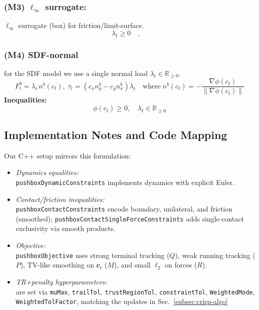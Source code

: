 \documentclass[conference]{IEEEtran}
\begin{document}
\subsubsection{(M3) $\ell_\infty$ surrogate:} $\ell_\infty$ surrogate (box) for friction/limit-surface.
\[
\lambda_{t}\ge 0\quad,
\quad
\]

\subsubsection{(M4) SDF-normal} for the SDF model we use a single normal load $\lambda_t\in\mathbb{R}_{\ge 0}$.
\[
F^b_t=\lambda_t\, n^b( c_t), \; \tau_t=(c_x n_y^b-c_y n_x^b)\lambda_t \quad \text{where} \;   n^b( c_t) = -\frac{\nabla\phi( c_t)}{\|\nabla\phi( c_t)\|}
\]
\textbf{Inequalities:}
\[
\phi( c_t)\ge0, \quad \lambda_t \in \mathbb{R}_{\ge 0}
\]

\subsection{Implementation Notes and Code Mapping}
\label{subsec:impl-mapping}
Our C++ setup mirrors this formulation:
\begin{itemize}
\item \textit{Dynamics equalities:} \\
\texttt{pushboxDynamicConstraints} implements dynamics with explicit Euler.

\item \textit{Contact/friction inequalities:} \\
\texttt{pushboxContactConstraints} encode boundary, unilateral, and friction (smoothed); \texttt{pushboxContactSingleForceConstraints} adds single-contact exclusivity via smooth products.

\item \textit{Objective:}\\
\texttt{pushboxObjective} uses strong terminal tracking ($Q$), weak running tracking ($P$), TV-like smoothing on $\mathbf c_t$ ($M$), and small $\ell_2$ on forces ($R$).

\item \textit{TR+penalty hyperparameters:} \\
are set via \texttt{muMax}, \texttt{trailTol}, \texttt{trustRegionTol}, \texttt{constraintTol}, \texttt{WeightedMode}, \texttt{WeightedTolFactor}, matching the updates in Sec.~\ref{subsec:crisp-algo}
\end{itemize}
\end{document}
